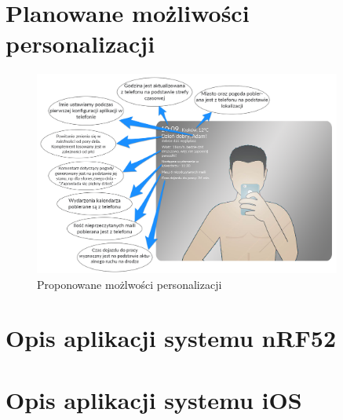 \documentclass[a4paper,11pt]{article}
\begin{document}
\section{Planowane możliwości personalizacji}
\begin{figure}[H]
	\includegraphics[width=0.9\textwidth,center]{dymki_kreski.png}
	\caption {Proponowane możlwości personalizacji}
	\label{lustro_on}
\end{figure}

\section{Opis aplikacji systemu nRF52 }

\section{Opis aplikacji systemu iOS}



	
\end{document}
